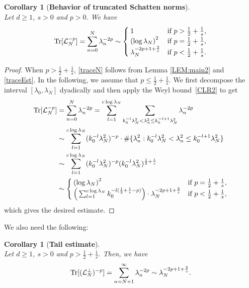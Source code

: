 \documentclass[%
11pt,  reqno]{amsart}
\newtheorem{corollary}[theorem]{Corollary}
\theoremstyle{remarkstyle}
\newcommand{\1}{\hspace{0.2mm}\text{I}\hspace{0.2mm}}
\renewcommand{\L}{\mathcal{L}}
\newcommand{\ld}{\lambda}
\numberwithin{equation}{section}
\numberwithin{theorem}{section}
\begin{document}
	\begin{corollary}[\textbf{Behavior of truncated Schatten norms}]\label{COR:CLR}\mbox{}\\
		Let $d\ge 1$, $s > 0$ and $ p > 0$. We have
		\begin{align}
			\label{traceN}
			{\rm{Tr}} [\L^{-p}_{N}] = \sum_{n = 0}^N \ld_n^{-2p} \sim 
			\begin{cases}
				1 &\text{if } p >\frac12 + \frac1s,\\ 
				\left(\log \ld_N\right)^2 &\text{if }  p = \frac12 + \frac1s,  \\
				\ld_N^{-2p+ 1 + \frac2s} &\text{if }   p<\frac12 + \frac1s.
			\end{cases} 
		\end{align}
	\end{corollary}
	
	\begin{proof}
		When $p > \frac12 + \frac1s$, \eqref{traceN} follows from Lemma \ref{LEM:main2} and \eqref{traceEst}. In the following, we assume that $p \le \frac12 + \frac1s$.
		We first decompose the interval $[\ld_0,\ld_N]$ dyadically and then apply the Weyl bound~\eqref{CLR2} to get
		\begin{align*}
			\begin{split}
				{\rm{Tr}} [\L^{-p}_{N}] & = \sum_{n = 0}^N \ld_n^{-2p}   = \sum_{l=1}^{c\log \ld_N} \sum_{k_0^{-l} \ld_N^2  < \ld_n^2 \le k_0^{-l+1} \ld_N^2}  \ld_n^{-2p} \\
				& \sim \sum_{l=1}^{c\log \ld_N} (k_0^{-l} \ld_N^2)^{-p} \cdot \#  \{\ld_n^2: k_0^{-l} \ld_N^2 < \ld_n^2 \le k_0^{-l+1} \ld_N^2\} \\
				& \sim \sum_{l=1}^{c\log \ld_N} (k_0^{-l} \ld_N^2)^{-p} (k_0^{-l} \ld_N^2)^{ \frac12+ \frac1s} \\
				& \sim  
				\begin{cases} \left(\log \ld_N\right)^2  &\text{if } p = \frac12 + \frac1s,\\  
					\Big( \sum_{l=1}^{c\log \ld_N} k_0^{-l(\frac12 + \frac1s -p)} \Big) \cdot \ld_N^{-2p + 1 + \frac2s} &\text{if } p < \frac12 + \frac1s,
				\end{cases}
			\end{split}
		\end{align*}
		which gives the desired estimate.
	\end{proof}
	
	We also need the following:
	
	\begin{corollary}[\textbf{Tail estimate}]\label{COR:CLR1}\mbox{}\\
		Let $d\geq 1$, $s > 0$ and $ p > \frac12 + \frac1s$.
		Then, we have
		\begin{align}
			\label{traceN1}
			{\rm{Tr}} [(\L^\perp_N)^{-p}] = \sum_{n = N+1}^\infty \ld_n^{-2p} \sim 
			\ld_N^{-2p+ 1 + \frac2s}.
		\end{align}
	\end{corollary}
	
\end{document}
